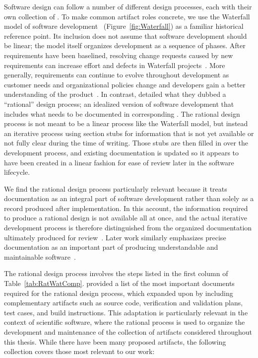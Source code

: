 Software design can follow a number of different design processes, each with
their own collection of \sfs{}. To make common artifact roles concrete, we use
the Waterfall model of software development~\citep{PfleegerAndAtlee2010Ch2}
(Figure~\ref{fig:Waterfall}) as a familiar historical reference point. Its
inclusion does not assume that software development should be linear; the
model itself organizes development as a sequence of phases. After requirements
have been baselined, resolving change requests
caused by new requirements can increase effort and defects in Waterfall 
projects~\citep{ChariEtAl2018}.
More generally, requirements can continue to evolve throughout development as 
customer needs and organizational policies change and developers gain a better
understanding of the product~\citep{NurmulianiEtAl2004}.
In contrast, \citet{ParnasAndClements1986} detailed what
they dubbed a ``rational'' design process; an idealized version of software
development that includes what needs to be documented in corresponding \sfs{}.
The rational design process is not meant to be a linear process like the 
Waterfall model, but instead an iterative process using section stubs for 
information that is not yet available or not fully clear during the time of 
writing. Those stubs are then filled in over the development process, and 
existing documentation is updated so it appears to have been created in a 
linear fashion for ease of review later in the software lifecycle.

We find the rational design process particularly relevant because it treats
documentation as an integral part of software development rather than
solely as a record produced after implementation. In this account, the
information required to produce a rational design is not available all at
once, and the actual iterative development process is therefore distinguished
from the organized documentation ultimately produced for
review~\citep{ParnasAndClements1986}. Later work similarly emphasizes precise
documentation as an important part of producing understandable and
maintainable software~\citep{Parnas2010,ParnasEtAl1994}.

The rational 
design process involves the steps listed in the first column of 
Table~\ref{tab:RatWatComp}. \citet{Parnas2010} provided a list of the most
important documents required for the rational design process, which
\citet{Smith2016} expanded upon by including complementary
artifacts such as source code, verification and validation plans, test cases, 
and build instructions. This adaptation is particularly relevant in the
context of scientific software, where the rational process is used to organize 
the development and maintenance of the collection of artifacts considered 
throughout this thesis. While there have been many proposed
artifacts, the following collection covers those most relevant to our work:


